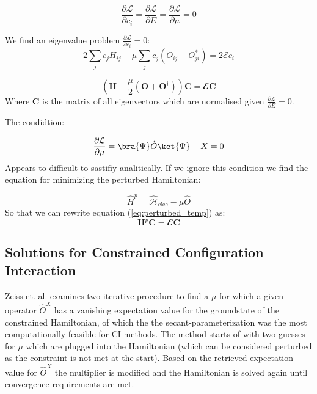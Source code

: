 \begin{equation}
      \frac{\partial \mathcal{L}}{\partial c_i} =  \frac{\partial \mathcal{L}}{\partial E} = \frac{\partial \mathcal{L}}{\partial \mu} = 0
\end{equation}


We find an eigenvalue problem $\frac{\partial \mathcal{L}}{\partial c_i} = 0$:
\begin{equation}\label{eq:perturbed_expanded}
  2 \sum_{j} c_j H_{ij} - \mu \sum_{j} c_j (O_{ij} + O_{ji}^*)  = 2 \mathcal{E} c_i
\end{equation}

\begin{equation}\label{eq:perturbed_matrix}
      (\textbf{H} - \frac{\mu}{2} (\textbf{O} + \textbf{O}^\dagger)) \textbf{C} = \mathbfcal{E}  \textbf{C}
\end{equation}
Where \textbf{C} is the matrix of all eigenvectors which are normalised given  $\frac{\partial \mathcal{L}}{\partial E} = 0$.

The condidtion:

\begin{equation}
  \frac{\partial \mathcal{L}}{\partial \mu} = \bra{\Psi} \hat{O} \ket{\Psi} - X = 0
\end{equation}
Appears to difficult to sastifiy analitically. If we ignore this condition we find the equation for minimizing the perturbed Hamiltonian:

\begin{equation}\label{eq:perturbed_ham}
    \hat{{H}}^{p} =  \hat{\mathcal{H}}_\text{elec} - \mu \hat{O}
\end{equation}
So that we can rewrite equation (\ref{eq:perturbed_temp}) as:
\begin{equation}
      \textbf{H}^{p} \textbf{C} = \mathbfcal{E}  \textbf{C}
\end{equation}


\subsection{Solutions for Constrained Configuration Interaction} \label{solutions}

  Zeiss et. al. \cite{zeiss1983constrainedci} examines two iterative procedure to find a $\mu$ for which a given operator $\hat{O}^X$ has a vanishing expectation value for the groundstate of the constrained Hamiltonian, of which the the secant-parameterization \cite{zeiss1983constrained} was the most computationally feasible for CI-methods. The method starts of with two guesses for $\mu$ which are plugged into the Hamiltonian (which can be considered perturbed as the constraint is not met at the start). Based on the retrieved expectation value for $\hat{O}^X$ the multiplier is modified and the Hamiltonian is solved again until convergence requirements are met.

